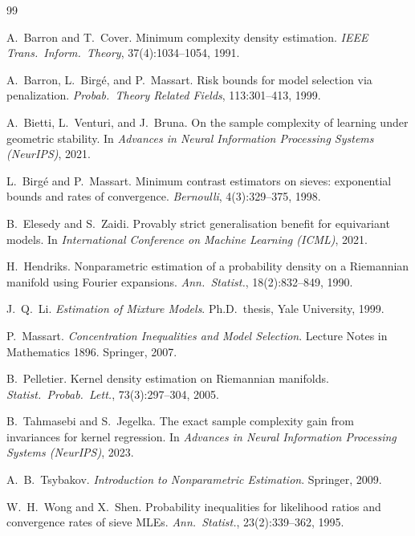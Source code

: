 \documentclass[11pt]{article}
\theoremstyle{plain}
\theoremstyle{definition}
\theoremstyle{remark}
\begin{document}
\begin{thebibliography}{99}

 A.~Barron and T.~Cover. Minimum complexity density
estimation. \emph{IEEE Trans.\ Inform.\ Theory}, 37(4):1034--1054, 1991.

 A.~Barron, L.~Birg\'e, and P.~Massart. Risk bounds for
model selection via penalization. \emph{Probab.\ Theory Related Fields},
113:301--413, 1999.

 A.~Bietti, L.~Venturi, and J.~Bruna. On the sample complexity
of learning under geometric stability. In \emph{Advances in Neural Information
Processing Systems (NeurIPS)}, 2021.

 L.~Birg\'e and P.~Massart. Minimum contrast estimators on
sieves: exponential bounds and rates of convergence. \emph{Bernoulli},
4(3):329--375, 1998.

 B.~Elesedy and S.~Zaidi. Provably strict generalisation
benefit for equivariant models. In \emph{International Conference on Machine
Learning (ICML)}, 2021.

 H.~Hendriks. Nonparametric estimation of a probability
density on a Riemannian manifold using Fourier expansions. \emph{Ann.\ Statist.},
18(2):832--849, 1990.

 J.~Q.~Li. \emph{Estimation of Mixture Models}. Ph.D.\ thesis, Yale
University, 1999.

 P.~Massart. \emph{Concentration Inequalities and Model
Selection}. Lecture Notes in Mathematics 1896. Springer, 2007.

 B.~Pelletier. Kernel density estimation on Riemannian
manifolds. \emph{Statist.\ Probab.\ Lett.}, 73(3):297--304, 2005.

 B.~Tahmasebi and S.~Jegelka. The exact sample complexity
gain from invariances for kernel regression. In \emph{Advances in Neural
Information Processing Systems (NeurIPS)}, 2023.

 A.~B.~Tsybakov. \emph{Introduction to Nonparametric Estimation}.
Springer, 2009.

 W.~H.~Wong and X.~Shen. Probability inequalities for likelihood
ratios and convergence rates of sieve MLEs. \emph{Ann.\ Statist.}, 23(2):339--362,
1995.

\end{thebibliography}
\end{document}
